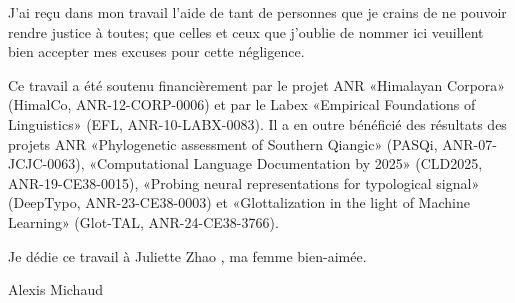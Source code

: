 J’ai reçu dans mon travail l’aide de tant de personnes que je crains de ne pouvoir rendre justice à toutes; que celles et ceux que j’oublie de nommer ici veuillent bien accepter mes excuses pour cette négligence.

Ce travail a été soutenu financièrement par le projet ANR «Himalayan Corpora» (HimalCo, ANR-12-CORP-0006) et par le Labex «Empirical Foundations of Linguistics» (EFL, ANR-10-LABX-0083). Il a en outre bénéficié des résultats des projets ANR «Phylogenetic assessment of Southern Qiangic» (PASQi, ANR-07-JCJC-0063), «Computational Language Documentation by 2025» (CLD2025, ANR-19-CE38-0015), «Probing neural representations for typological signal» (DeepTypo, ANR-23-CE38-0003) et «Glottalization in the light of Machine Learning» (Glot-TAL, ANR-24-CE38-3766).

Je dédie ce travail à Juliette Zhao , ma femme bien-aimée.

{\raggedleft Alexis Michaud\par}

